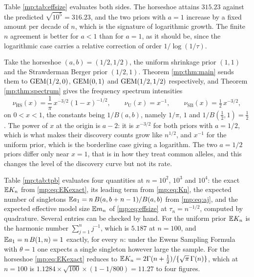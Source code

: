 Table \ref{mp:tab:effsize} evaluates both sides. The horseshoe attains $315.23$ against the
predicted $\sqrt{10^5}=316.23$, and the two priors with $a=1$ increase by a fixed amount per
decade of $n$, which is the signature of logarithmic growth. The finite $n$ agreement is
better for $a<1$ than for $a=1$, as it should be, since the logarithmic case carries a
relative correction of order $1/\log(1/\tau)$.

\begin{example}
\label{mp:ex:tpb}
Take the horseshoe $(a,b)=(1/2,1/2)$, the uniform shrinkage prior $(1,1)$ and the
Strawderman Berger prior $(1/2,1)$. Theorem \ref{mp:thm:main} sends them to
$\mathrm{GEM}(1/2,0)$, $\mathrm{GEM}(0,1)$ and $\mathrm{GEM}(1/2,1/2)$ respectively, and Theorem
\ref{mp:thm:spectrum} gives the frequency spectrum intensities
\[
\nu_{\mathrm{HS}}(x)=\frac{1}{\pi}\,x^{-3/2}(1-x)^{-1/2},\qquad
\nu_{\mathrm{U}}(x)=x^{-1},\qquad
\nu_{\mathrm{SB}}(x)=\tfrac12\,x^{-3/2},
\]
on $0<x<1$, the constants being $1/B(a,b)$, namely $1/\pi$, $1$ and $1/B(\tfrac12,1)=\tfrac12$.
The power of $x$ at the origin is $a-2$: it is $x^{-3/2}$ for both priors with $a=1/2$, which
is what makes their discovery counts grow like $n^{1/2}$, and $x^{-1}$ for the uniform prior,
which is the borderline case giving a logarithm. The two $a=1/2$ priors differ only near
$x=1$, that is in how they treat common alleles, and this changes the level of the discovery
curve but not its rate.

Table \ref{mp:tab:tpb} evaluates four quantities at $n=10^2$, $10^3$ and $10^4$: the exact
$\mathbb{E} K_n$ from \eqref{mp:eq:EKexact}, its leading term from \eqref{mp:eq:Kn}, the expected
number of singletons $\mathbb{E} a_1=n\,B(a,b+n-1)/B(a,b)$ from \eqref{mp:eq:aj}, and the expected
effective model size $\mathbb{E} m_n$ of \eqref{mp:eq:effsize} at $\tau_n=n^{-1/2}$, computed by
quadrature. Several entries can be checked by hand. For the uniform prior $\mathbb{E} K_n$ is the
harmonic number $\sum_{j=1}^n j^{-1}$, which is $5.187$ at $n=100$, and $\mathbb{E} a_1=n\,B(1,n)=1$
exactly, for every $n$: under the Ewens Sampling Formula with $\theta=1$ one expects a single
singleton however large the sample. For the horseshoe \eqref{mp:eq:EKexact} reduces to
$\mathbb{E} K_n=2\Gamma(n+\tfrac12)/\{\sqrt\pi\,\Gamma(n)\}$, which at $n=100$ is
$1.1284\times\sqrt{100}\times(1-1/800)=11.27$ to four figures.


\end{example}
